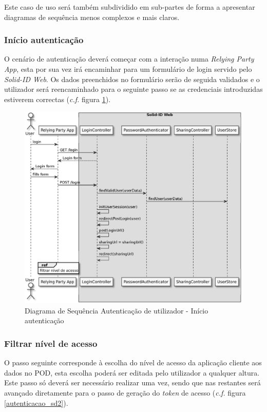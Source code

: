 Este caso de uso será também subdividido em sub-partes de forma a apresentar diagramas de sequência menos complexos e mais claros.

\subsubsection{Início autenticação}

O cenário de autenticação deverá começar com a interação numa \emph{Relying Party App}, esta por sua vez irá encaminhar para um formulário de login servido pelo \emph{Solid-ID Web}. Os dados preenchidos no formulário serão de seguida validados e o utilizador será reencaminhado para o seguinte passo se as credenciais introduzidas estiverem correctas (\emph{c.f.} figura \ref{autenticacao_sd1}).

\begin{figure}[h]
    \begin{center}
    \includegraphics[width=0.9 \textwidth]{figures/authentication_sd_1.eps}
    \caption{Diagrama de Sequência Autenticação de utilizador - Início autenticação}
        \label{autenticacao_sd1}
    \end{center}
\end{figure}

\subsubsection{Filtrar nível de acesso}
O passo seguinte corresponde à escolha do nível de acesso da aplicação cliente aos dados no POD, esta escolha poderá ser editada pelo utilizador a qualquer altura.
Este passo só deverá ser necessário realizar uma vez, sendo que nas restantes será avançado diretamente para o passo de geração do \emph{token} de acesso (\emph{c.f.} figura \ref{autenticacao_sd2}).

